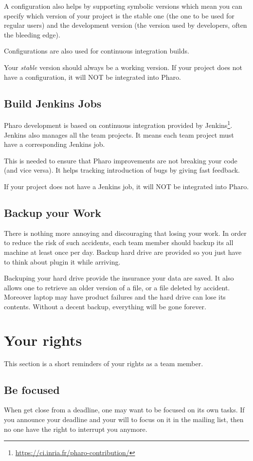 \documentclass[10pt]{article}
\begin{document}
A configuration also helps by supporting symbolic versions which mean you can specify which version of your project is the stable one (the one to be used for regular users) and the development version (the version used by developers, often the bleeding edge).

Configurations are also used for continuous integration builds.

Your \emph{stable} version should always be a working version. If your project does not have a configuration, it will NOT be integrated into Pharo.

\subsection{Build Jenkins Jobs}
Pharo development is based on continuous integration provided by Jenkins\footnote{\url{https://ci.inria.fr/pharo-contribution/}}. Jenkins also manages all the team projects. It means each team project must have a corresponding Jenkins job. 

This is needed to ensure that Pharo improvements are not breaking your code (and vice versa). It helps tracking introduction of bugs by giving fast feedback.

If your project does not have a Jenkins job, it will NOT be integrated into Pharo.

\subsection{Backup your Work}
There is nothing more annoying and discouraging that losing your work. In order to reduce the risk of such accidents, each team member should backup its all machine at least once per day. Backup hard drive are provided so you just have to think about plugin it while arriving.

Backuping your hard drive provide the insurance your data are saved. It also allows one to retrieve an older version of a file, or a file deleted by accident.
Moreover laptop may have product failures and the hard drive can lose its contents. Without a decent backup, everything will be gone forever.

\section{Your rights}

This section is a short reminders of your rights as a team member.

\subsection{Be focused}
When get close from a deadline, one may want to be focused on its own tasks.
If you announce your deadline and your will to focus on it in the mailing list, then no one have the right to interrupt you anymore.
\end{document}
